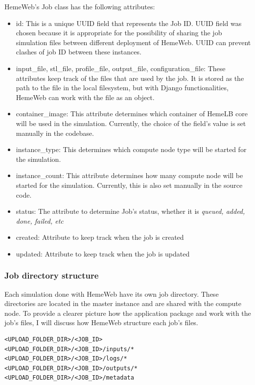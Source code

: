 HemeWeb's Job class has the following attributes:
\begin{itemize}
    \item id:  This is a unique UUID field that represents the Job ID. UUID field was chosen because it is appropriate for the possibility of sharing the job simulation files between different deployment of HemeWeb. UUID can prevent clashes of job ID between these instances.
    \item input\_file, stl\_file, profile\_file, output\_file, configuration\_file:  These attributes keep track of the files that are used by the job. It is stored as the path to the file in the local filesystem, but with Django functionalities, HemeWeb can work with the file as an object.
    \item container\_image:  This attribute determines which container of HemeLB core will be used in the simulation. Currently, the choice of the field's value is set manually in the codebase. 
    \item instance\_type: This determines which compute node type will be started for the simulation. 
    \item instance\_count: This attribute determines how many compute node will be started for the simulation. Currently, this is also set manually in the source code. 
    \item status: The attribute to determine Job's status, whether it is \textit{queued, added, done, failed, etc}
    \item created: Attribute to keep track when the job is created
    \item updated: Attribute to keep track when the job is updated 
\end{itemize}



\subsubsection{Job directory structure}

Each simulation done with HemeWeb have its own job directory. These directories are located in the master instance and are shared with the compute node. To provide a clearer picture how the application package and work with the job's files, I will discuss how HemeWeb structure each job's files.


\begin{lstlisting}
<UPLOAD_FOLDER_DIR>/<JOB_ID>
<UPLOAD_FOLDER_DIR>/<JOB_ID>/inputs/*
<UPLOAD_FOLDER_DIR>/<JOB_ID>/logs/*
<UPLOAD_FOLDER_DIR>/<JOB_ID>/outputs/*
<UPLOAD_FOLDER_DIR>/<JOB_ID>/metadata
\end{lstlisting}


